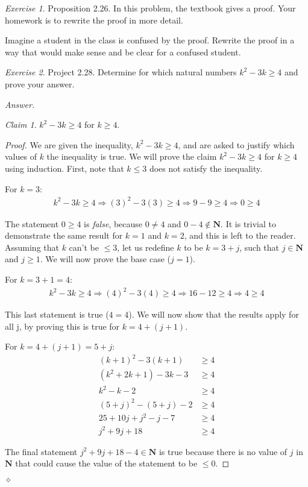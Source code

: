 \documentclass[12pt,oneside]{amsart}
\theoremstyle{remark}
\newtheorem{exer}{Exercise}
\newtheorem{claim}{Claim}[exer]
\newcommand{\bfN}{\mathbf{N}}
\newenvironment{answer}{\bigskip\noindent\emph{Answer.}}{\hfill$\diamond$\newline}
\begin{document}
\newpage
\begin{exer}
Proposition 2.26. In this problem, the textbook gives a proof. Your homework is to rewrite the proof in more detail.

Imagine a student in the class is confused by the proof. Rewrite the proof in a way that would make sense and be clear for a confused student.
\end{exer}

\newpage
\begin{exer}
Project 2.28. Determine for which natural numbers $k^2 - 3k \geq 4$
and prove your answer.
\end{exer}

\begin{answer}
\begin{claim}
$k^2 - 3k \geq 4$ for $k \geq 4$.
\end{claim}

\begin{proof}
We are given the inequality, $k^2 - 3k \geq 4$, and are asked to justify which values of $k$ the inequality is true. We will prove the claim $k^2 - 3k \geq 4$ for $k \geq 4$ using induction. First, note that $k \leq 3$ does not satisfy the inequality.

For $k = 3$:
\begin{align*}
    k^2 - 3k \geq 4 \Rightarrow
(3)^2 - 3(3) \geq 4 \Rightarrow
       9 - 9 \geq 4 \Rightarrow
           0 \geq 4
\end{align*}

The statement $0 \geq 4$ is \emph{false}, because $0 \neq 4$ and $0 - 4 \notin \bfN$. It is trivial to demonstrate the same result for $k = 1$ and $k = 2$, and this is left to the reader. Assuming that $k$ can't be $\leq 3$, let us redefine $k$ to be $k = 3 + j$, such that $j \in \bfN$ and $j \geq 1$. We will now prove the base case ($j = 1$).

For $k = 3 + 1 = 4$:
\begin{align*}
    k^2 - 3k \geq 4 \Rightarrow
(4)^2 - 3(4) \geq 4 \Rightarrow
     16 - 12 \geq 4 \Rightarrow
           4 \geq 4
\end{align*}

This last statement is true ($4 = 4$). We will now show that the results apply for all j, by proving this is true for $k = 4 + (j + 1)$.

For $k = 4 + (j + 1) = 5 + j$:
\begin{align*}
   (k + 1)^2 - 3(k + 1) &\geq 4 \\
(k^2 + 2k + 1) - 3k - 3 &\geq 4 \\
            k^2 - k - 2 &\geq 4 \\
(5 + j)^2 - (5 + j) - 2 &\geq 4 \\
 25 + 10j + j^2 - j - 7 &\geq 4 \\
          j^2 + 9j + 18 &\geq 4
\end{align*}

The final statement $j^2 + 9j + 18 - 4 \in \bfN$ is true because there is no value of $j$ in $\bfN$ that could cause the value of the statement to be $\leq 0$.
\end{proof}
\end{answer}
\end{document}
